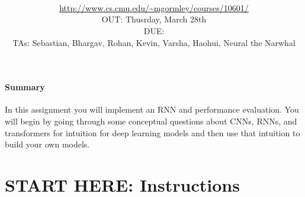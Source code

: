 \documentclass[11pt,addpoints,answers]{exam}
\title{\textsc{\hwName}
} %
\author{\courseName\\
\url{http://www.cs.cmu.edu/~mgormley/courses/10601/} \\
OUT: Thusrday, March 28th \\
DUE: \dueDate{} \\ 
TAs: Sebastian, Bhargav, Rohan, Kevin, Varsha, Haohui, Neural the Narwhal
}
\date{}
\date{}
\begin{document}
\maketitle

\begin{notebox}
\paragraph{Summary} In this assignment you will implement an RNN and performance evaluation. You will begin by going through some conceptual questions about CNNs, RNNs, and transformers for intuition for deep learning models and then use that intuition to build your own models.
\end{notebox}\vspace*{-3mm}
\section*{START HERE: Instructions}
\end{document}
